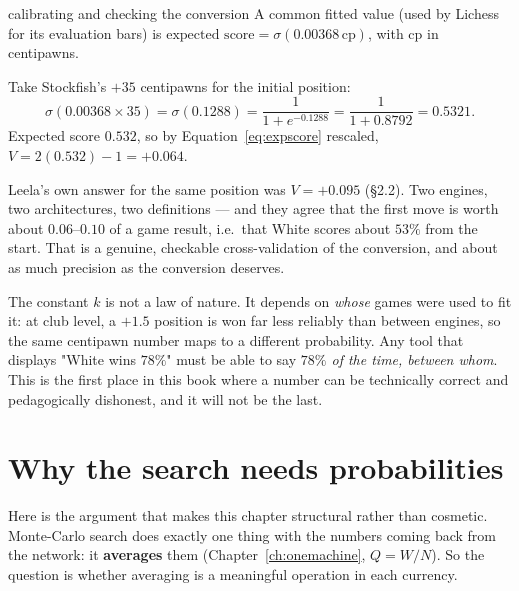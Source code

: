 \begin{worked}{calibrating and checking the conversion}
A common fitted value (used by Lichess for its evaluation bars) is
$\text{expected score} = \sigma(0.00368\,\text{cp})$, with cp in centipawns.

Take Stockfish's $+35$ centipawns for the initial position:
\[
\sigma(0.00368 \times 35) = \sigma(0.1288) = \frac{1}{1+e^{-0.1288}}
= \frac{1}{1+0.8792} = 0.5321 .
\]
Expected score $0.532$, so by Equation~\eqref{eq:expscore} rescaled,
$V = 2(0.532)-1 = +0.064$.

Leela's own answer for the same position was $V = +0.095$ (§2.2). Two engines, two
architectures, two definitions --- and they agree that the first move is worth about
$0.06$--$0.10$ of a game result, i.e.\ that White scores about $53\%$ from the start. That is
a genuine, checkable cross-validation of the conversion, and about as much precision as the
conversion deserves.
\end{worked}

\begin{pitfall}
The constant $k$ is not a law of nature. It depends on \emph{whose} games were used to fit
it: at club level, a $+1.5$ position is won far less reliably than between engines, so the
same centipawn number maps to a different probability. Any tool that displays "White wins
$78\%$" must be able to say \emph{$78\%$ of the time, between whom}. This is the first place
in this book where a number can be technically correct and pedagogically dishonest, and it
will not be the last.
\end{pitfall}

\section{Why the search needs probabilities}

Here is the argument that makes this chapter structural rather than cosmetic. Monte-Carlo
search does exactly one thing with the numbers coming back from the network: it
\textbf{averages} them (Chapter~\ref{ch:onemachine}, $Q = W/N$). So the question is whether
averaging is a meaningful operation in each currency.


